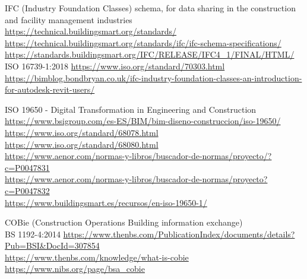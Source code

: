 \documentclass[spanish,12pt,a4paper,final,oneside]{book}
\begin{document}
\vspace{0.3cm}
IFC (Industry Foundation Classes) schema, for data sharing in the construction and facility management industries
\\ \url{https://technical.buildingsmart.org/standards/}
\\ \url{https://technical.buildingsmart.org/standards/ifc/ifc-schema-specifications/}
\\ \url{https://standards.buildingsmart.org/IFC/RELEASE/IFC4_1/FINAL/HTML/}
\\ISO 16739-1:2018 \url{https://www.iso.org/standard/70303.html}
\url{https://bimblog.bondbryan.co.uk/ifc-industry-foundation-classes-an-introduction-for-autodesk-revit-users/}

\vspace{0.3cm}
ISO 19650 - Digital Transformation in Engineering and Construction
\\ \url{https://www.bsigroup.com/es-ES/BIM/bim-diseno-construccion/iso-19650/}
\\ \url{https://www.iso.org/standard/68078.html}
\\ \url{https://www.iso.org/standard/68080.html}
\\ \url{https://www.aenor.com/normas-y-libros/buscador-de-normas/proyecto/?c=P0047831}
\\ \url{https://www.aenor.com/normas-y-libros/buscador-de-normas/proyecto?c=P0047832}
\\ \url{https://www.buildingsmart.es/recursos/en-iso-19650-1/}

\vspace{0.3cm}
COBie (Construction Operations Building information exchange)
\\BS 1192-4:2014 \url{https://www.thenbs.com/PublicationIndex/documents/details?Pub=BSI&DocId=307854}
\\ \url{https://www.thenbs.com/knowledge/what-is-cobie}
\\ \url{https://www.nibs.org/page/bsa_cobie}
\end{document}
